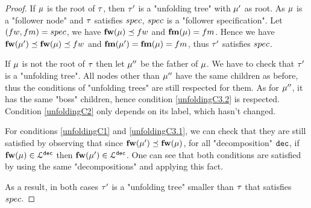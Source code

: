 \begin{proof}
	If $\mu$ is the root of $\tau$, then $\tau'$ is a "unfolding tree" with $\mu'$ as root. As $\mu$ is a "follower node" and $\tau$ satisfies $\spec$, $\spec$ is a "follower specification". Let $(\followwordspec, \followmessagespec) = \spec$, we have $\followlabelword{\node} \subword \followwordspec$ and $\followlabelmessage{\node} = \followmessagespec$. 
	Hence we have $\followlabelword{\node'} \subword \followlabelword{\node} \subword \followwordspec $ and $\followlabelmessage{\node'} = \followlabelmessage{\node} = \followmessagespec$, thus $\tau'$ satisfies $\spec$.
	
	If  $\mu$ is not the root of $\tau$ then let $\mu''$ be the father of $\mu$. We have to check that $\tau'$ is a "unfolding tree". 
	All nodes other than $\mu''$ have the same children as before, thus the conditions of "unfolding trees" are still respected for them.
	As for $\mu''$, it has the same "boss" children, hence condition \ref{unfoldingC3.2} is respected. Condition \ref{unfoldingC2} only depends on its label, which hasn't changed.
	
	For conditions \ref{unfoldingC1} and \ref{unfoldingC3.1}, we can check that they are still satisfied by observing that since $\mathbf{fw}(\mu') \preceq \mathbf{fw}(\mu)$, for all "decomposition" $\mathtt{dec}$, if $\mathbf{fw}(\mu) \in \mathcal{L}^{\mathtt{\mathtt{dec}}}$ then $\mathbf{fw}(\mu') \in \mathcal{L}^{\mathtt{\mathtt{dec}}}$. One can see that both conditions are satisfied by using the same "decompositions" and applying this fact.
	
	As a result, in both cases $\tau'$ is a "unfolding tree" smaller than $\tau$ that satisfies $\spec$. 
\end{proof}

